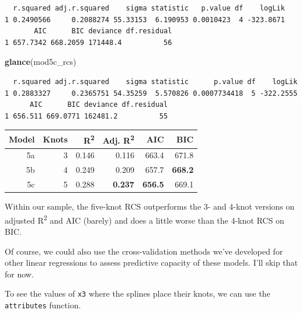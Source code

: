 \documentclass[]{book}
\newenvironment{Shaded}{\begin{snugshade}}{\end{snugshade}}
\newcommand{\KeywordTok}[1]{\textcolor[rgb]{0.13,0.29,0.53}{\textbf{#1}}}
\newcommand{\DecValTok}[1]{\textcolor[rgb]{0.00,0.00,0.81}{#1}}
\newcommand{\OperatorTok}[1]{\textcolor[rgb]{0.81,0.36,0.00}{\textbf{#1}}}
\newcommand{\NormalTok}[1]{#1}
\theoremstyle{definition}
\theoremstyle{definition}
\theoremstyle{definition}
\theoremstyle{remark}
\begin{document}
\begin{verbatim}
  r.squared adj.r.squared    sigma statistic   p.value df    logLik
1 0.2490566     0.2088274 55.33153  6.190953 0.0010423  4 -323.8671
       AIC      BIC deviance df.residual
1 657.7342 668.2059 171448.4          56
\end{verbatim}

\begin{Shaded}
\begin{Highlighting}[]
\KeywordTok{glance}\NormalTok{(mod5c_rcs)}
\end{Highlighting}
\end{Shaded}

\begin{verbatim}
  r.squared adj.r.squared    sigma statistic      p.value df    logLik
1 0.2883327     0.2365751 54.35259  5.570826 0.0007734418  5 -322.2555
      AIC      BIC deviance df.residual
1 656.511 669.0771 162481.2          55
\end{verbatim}

\begin{longtable}[]{@{}rrrrrr@{}}
\toprule
Model & Knots & R\textsuperscript{2} & Adj. R\textsuperscript{2} & AIC &
BIC\tabularnewline
\midrule
\endhead
5a & 3 & 0.146 & 0.116 & 663.4 & 671.8\tabularnewline
5b & 4 & 0.249 & 0.209 & 657.7 & \textbf{668.2}\tabularnewline
5c & 5 & 0.288 & \textbf{0.237} & \textbf{656.5} & 669.1\tabularnewline
\bottomrule
\end{longtable}

Within our sample, the five-knot RCS outperforms the 3- and 4-knot
versions on adjusted R\textsuperscript{2} and AIC (barely) and does a
little worse than the 4-knot RCS on BIC.

Of course, we could also use the cross-validation methods we've
developed for other linear regressions to assess predictive capacity of
these models. I'll skip that for now.

To see the values of \texttt{x3} where the splines place their knots, we
can use the \texttt{attributes} function.

\begin{Shaded}
\end{Shaded}
\end{document}
